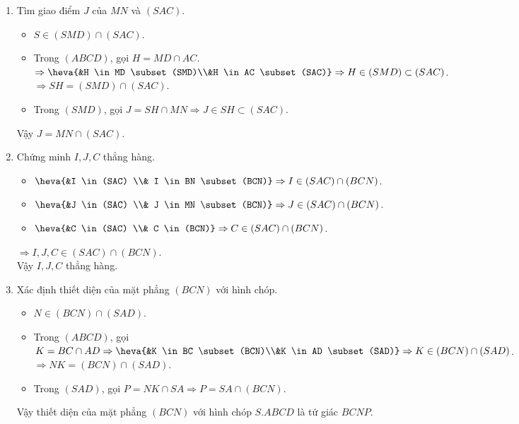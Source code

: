\begin{bt}
\begin{bt}
{\begin{enumerate}
\begin{itemize}
				$\Rightarrow SO=(SAC) \cap (SBD)$.\\
				\item Trong $(SBD)$, gọi $I=BN \cap SO \Rightarrow I \in SO \subset (SAC)$.
			\end{itemize}
			Vậy $I=	BN \cap (SAC)$.
			\item Tìm giao điểm $J$ của $MN$ và $(SAC)$.
			\begin{itemize}
				\item $ S \in (SMD) \cap (SAC)$.
				\item  Trong $(ABCD)$, gọi $H=MD \cap AC$.\\
				$ \Rightarrow \heva{&H \in MD \subset (SMD)\\&H \in AC \subset (SAC)}\Rightarrow H \in (SMD) \subset (SAC)$.\\
				$\Rightarrow SH = (SMD) \cap (SAC)$.
				\item  Trong $(SMD)$, gọi $J = SH \cap MN \Rightarrow J \in SH \subset (SAC)$.
			\end{itemize}
			Vậy $J =MN \cap (SAC)$. 
			\item Chứng minh $I, J, C$ thẳng hàng.
			\begin{itemize}
				\item $\heva{&I \in (SAC) \\& I \in BN \subset (BCN)} \Rightarrow I \in (SAC) \cap (BCN)$.
				\item $\heva{&J \in (SAC) \\& J \in MN \subset (BCN)} \Rightarrow J \in (SAC) \cap (BCN)$.
				\item $\heva{&C \in (SAC) \\& C \in  (BCN)} \Rightarrow C \in (SAC) \cap (BCN)$.
			\end{itemize}
			$\Rightarrow I, J, C \in (SAC) \cap (BCN)$.\\
			Vậy $I, J, C$ thẳng hàng.
			\item Xác định thiết diện của mặt phẳng $(BCN)$ với hình chóp.
			\begin{itemize}
				\item $N \in (BCN) \cap (SAD)$.
				\item  Trong $(ABCD)$, gọi $K = BC \cap AD \Rightarrow \heva{&K \in BC \subset (BCN)\\&K \in AD \subset (SAD)} \Rightarrow K \in (BCN) \cap (SAD)$.\\
				$\Rightarrow NK =(BCN) \cap (SAD)$.
				\item Trong $(SAD)$, gọi $P =NK \cap SA \Rightarrow P = SA \cap (BCN)$.
			\end{itemize}
			Vậy thiết diện của mặt phẳng $(BCN)$ với hình chóp $S.ABCD$ là tứ giác $BCNP$.
		\end{enumerate}
	}
\end{bt}


\end{bt}
